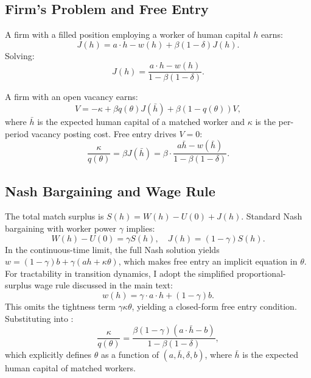\documentclass[12pt]{article}
\begin{document}
\subsection{Firm's Problem and Free Entry}

A firm with a filled position employing a worker of human capital $h$ earns:
\begin{equation}
J(h) = a \cdot h - w(h) + \beta(1 - \delta) J(h).
\label{eq:app_J}
\end{equation}
Solving:
\begin{equation}
J(h) = \frac{a \cdot h - w(h)}{1 - \beta(1 - \delta)}.
\label{eq:app_J_solved}
\end{equation}

A firm with an open vacancy earns:
\begin{equation}
V = -\kappa + \beta q(\theta) J(\bar{h}) + \beta(1 - q(\theta)) V,
\label{eq:app_V}
\end{equation}
where $\bar{h}$ is the expected human capital of a matched worker and $\kappa$ is the per-period vacancy posting cost. Free entry drives $V = 0$:
\begin{equation}
\frac{\kappa}{q(\theta)} = \beta J(\bar{h}) = \beta \cdot \frac{a \bar{h} - w(\bar{h})}{1 - \beta(1 - \delta)}.
\label{eq:app_freeentry}
\end{equation}

\subsection{Nash Bargaining and Wage Rule}

The total match surplus is $S(h) = W(h) - U(0) + J(h)$. Standard Nash bargaining with worker power $\gamma$ implies:
\begin{equation}
W(h) - U(0) = \gamma S(h), \quad J(h) = (1 - \gamma) S(h).
\label{eq:app_nash}
\end{equation}
In the continuous-time limit, the full Nash solution yields $w = (1-\gamma)b + \gamma(ah + \kappa\theta)$, which makes free entry an implicit equation in $\theta$. For tractability in transition dynamics, I adopt the simplified proportional-surplus wage rule discussed in the main text:
\begin{equation}
w(h) = \gamma \cdot a \cdot h + (1 - \gamma) b.
\label{eq:app_wage}
\end{equation}
This omits the tightness term $\gamma\kappa\theta$, yielding a closed-form free entry condition. Substituting into :
\begin{equation}
\frac{\kappa}{q(\theta)} = \frac{\beta(1 - \gamma)(a \cdot \bar{h} - b)}{1 - \beta(1 - \delta)},
\label{eq:app_freeentry2}
\end{equation}
which explicitly defines $\theta$ as a function of $(a, \bar{h}, \delta, b)$, where $\bar{h}$ is the expected human capital of matched workers.
\end{document}
